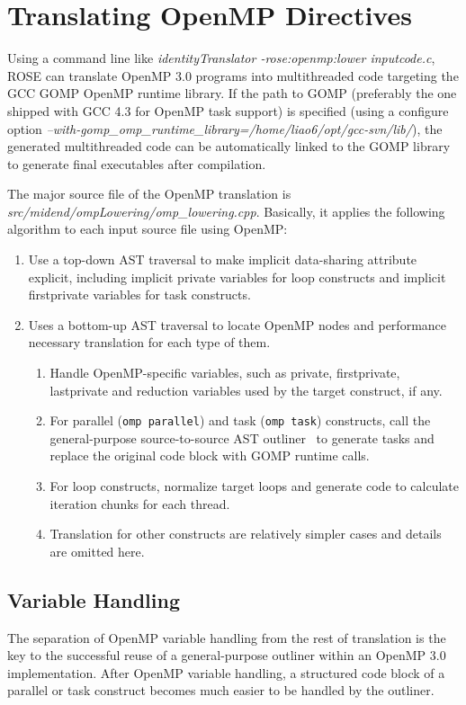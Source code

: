 \section{Translating OpenMP Directives}
Using a command line like \textit{identityTranslator -rose:openmp:lower inputcode.c},
ROSE can translate OpenMP 3.0 programs into multithreaded code targeting the GCC GOMP OpenMP runtime library.
If the path to GOMP (preferably the one shipped with GCC 4.3 for OpenMP task support) is specified (using a configure option \textit{--with-gomp\_omp\_runtime\_library=/home/liao6/opt/gcc-svn/lib/}),
the generated multithreaded code can be automatically linked to the GOMP library to generate final executables after compilation. 

The major source file of the OpenMP translation is \textit{src/midend/ompLowering/omp\_lowering.cpp}. 
Basically, it applies the following algorithm to each input source file using OpenMP:
\begin{enumerate}
\item  Use a top-down AST traversal to make implicit data-sharing attribute explicit, including implicit private variables for loop constructs and implicit firstprivate variables for task constructs. 
\item  Uses a bottom-up AST traversal to locate OpenMP nodes and performance necessary translation for each type of them.
\begin{enumerate}
\item Handle OpenMP-specific variables, such as private, firstprivate, lastprivate and reduction variables used by the target construct, if any.
\item For parallel (\lstinline{omp parallel}) and task (\lstinline{omp task}) constructs, call the general-purpose source-to-source AST outliner~\cite{LiaoEffective2009} to generate tasks and replace the original code block with GOMP runtime calls.
\item For loop constructs, normalize target loops and generate code to
calculate iteration chunks for each thread.
\item Translation for other constructs are relatively simpler cases and
details are omitted here.
\end{enumerate}
\end{enumerate}

\subsection{Variable Handling}
The separation of OpenMP variable handling from the rest of translation is
the key to the successful reuse of a general-purpose outliner within an OpenMP 3.0 implementation. 
After OpenMP variable handling, a structured code block of a parallel or task construct becomes much easier to be handled by the outliner.

